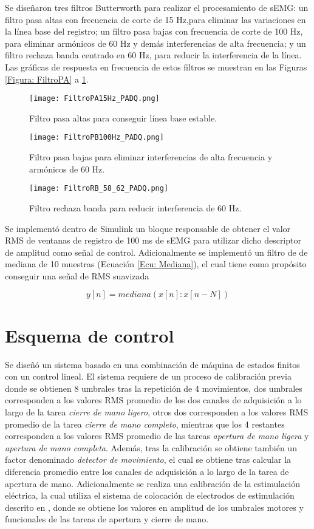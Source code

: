 Se diseñaron tres filtros Butterworth para realizar el procesamiento de sEMG: un filtro pasa altas con frecuencia de corte de 15 Hz,para eliminar las variaciones en la línea base del registro; un filtro pasa bajas con frecuencia de corte de 100 Hz, para eliminar armónicos de 60 Hz y demás interferencias de alta frecuencia; y un filtro rechaza banda centrado en 60 Hz, para reducir la interferencia de la línea. Las gráficas de respuesta en frecuencia de estos filtros se muestran en las Figuras \ref{Figura: FiltroPA} a \ref{Figura: FiltroRB}.

\begin{figure}[htbp]
	\centering
	\texttt{[image: FiltroPA15Hz\_PADQ.png]}
	\caption{Filtro pasa altas para conseguir línea base estable.}
	\label{Figura: FiltroPA}
	
	\texttt{[image: FiltroPB100Hz\_PADQ.png]}
	\caption{Filtro pasa bajas para eliminar interferencias de alta frecuencia y armónicos de 60 Hz.} 
	\label{Figura: FiltroPB}
	
	\texttt{[image: FiltroRB\_58\_62\_PADQ.png]}
	\caption{Filtro rechaza banda para reducir interferencia de 60 Hz.}
	\label{Figura: FiltroRB}
\end{figure}

Se implementó dentro de Simulink un bloque responsable de obtener el valor RMS de ventanas de registro de 100 ms de sEMG para utilizar dicho descriptor de amplitud como señal de control. Adicionalmente se implementó un filtro de de mediana de 10 muestras (Ecuación \ref{Ecu: Mediana}), el cual tiene como propósito conseguir una señal de RMS suavizada

\begin{equation}
	y[n] = mediana(x[n]:x[n-N])
	\label{Ecu: Mediana}
\end{equation}

\newpage
\section{Esquema de control}
Se diseñó un sistema basado en una combinación de máquina de estados finitos con un control lineal. El sistema requiere de un proceso de calibración previa donde se obtienen 8 umbrales tras la repetición de 4 movimientos, dos umbrales corresponden a los valores RMS promedio de los dos canales de adquisición a lo largo de la tarea \emph{cierre de mano ligero}, otros dos corresponden a los valores RMS promedio de la tarea \emph{cierre de mano completo}, mientras que los 4 restantes corresponden a los valores RMS promedio de las tareas \emph{apertura de mano ligera} y \emph{apertura de mano completa}. Además, tras la calibración se obtiene también un factor denominado \emph{detector de movimiento}, el cual se obtiene tras calcular la diferencia promedio entre los canales de adquisición a lo largo de la tarea de apertura de mano. Adicionalmente se realiza una calibración de la estimulación eléctrica, la cual utiliza el sistema de colocación de electrodos de estimulación descrito en \cite{AnaMartin2019}, donde se obtiene los valores en amplitud de los umbrales motores y funcionales de las tareas de apertura y cierre de mano.

